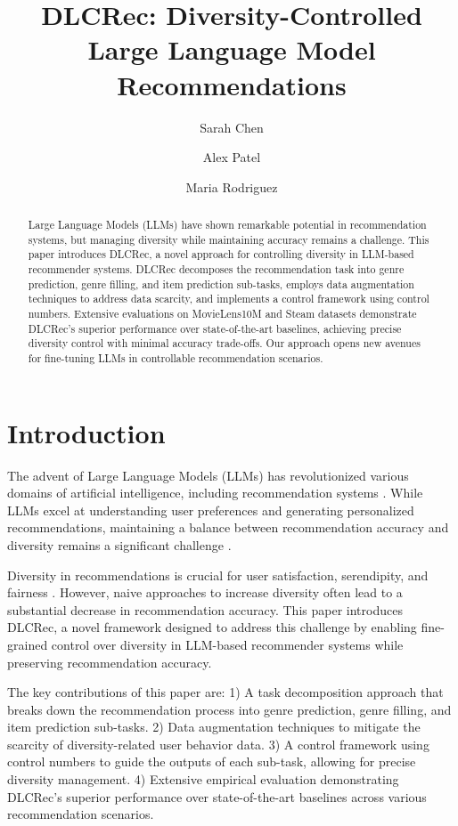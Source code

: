 \documentclass[12pt,letterpaper]{article}
\title{DLCRec: Diversity-Controlled Large Language Model Recommendations}
\author{Sarah Chen \and Alex Patel \and Maria Rodriguez}
\begin{document}
\maketitle

\begin{abstract}
Large Language Models (LLMs) have shown remarkable potential in recommendation systems, but managing diversity while maintaining accuracy remains a challenge. This paper introduces DLCRec, a novel approach for controlling diversity in LLM-based recommender systems. DLCRec decomposes the recommendation task into genre prediction, genre filling, and item prediction sub-tasks, employs data augmentation techniques to address data scarcity, and implements a control framework using control numbers. Extensive evaluations on MovieLens10M and Steam datasets demonstrate DLCRec's superior performance over state-of-the-art baselines, achieving precise diversity control with minimal accuracy trade-offs. Our approach opens new avenues for fine-tuning LLMs in controllable recommendation scenarios.
\end{abstract}

\section{Introduction}

The advent of Large Language Models (LLMs) has revolutionized various domains of artificial intelligence, including recommendation systems \cite{zhang2023survey}. While LLMs excel at understanding user preferences and generating personalized recommendations, maintaining a balance between recommendation accuracy and diversity remains a significant challenge \cite{abdollahpouri2020multistakeholder}.

Diversity in recommendations is crucial for user satisfaction, serendipity, and fairness \cite{kunaver2017diversity}. However, naive approaches to increase diversity often lead to a substantial decrease in recommendation accuracy. This paper introduces DLCRec, a novel framework designed to address this challenge by enabling fine-grained control over diversity in LLM-based recommender systems while preserving recommendation accuracy.

The key contributions of this paper are:
1) A task decomposition approach that breaks down the recommendation process into genre prediction, genre filling, and item prediction sub-tasks.
2) Data augmentation techniques to mitigate the scarcity of diversity-related user behavior data.
3) A control framework using control numbers to guide the outputs of each sub-task, allowing for precise diversity management.
4) Extensive empirical evaluation demonstrating DLCRec's superior performance over state-of-the-art baselines across various recommendation scenarios.
\end{document}
